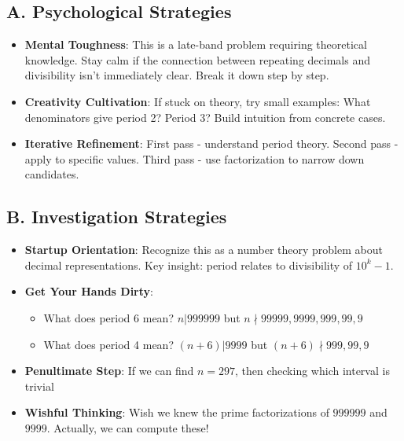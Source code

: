 \documentclass[11pt]{article}
\begin{document}
\begin{strategicbox}
\subsection*{A. Psychological Strategies}
\begin{itemize}[leftmargin=*]
    \item \textbf{Mental Toughness}: This is a late-band problem requiring theoretical knowledge. Stay calm if the connection between repeating decimals and divisibility isn't immediately clear. Break it down step by step.
    
    \item \textbf{Creativity Cultivation}: If stuck on theory, try small examples: What denominators give period 2? Period 3? Build intuition from concrete cases.
    
    \item \textbf{Iterative Refinement}: First pass - understand period theory. Second pass - apply to specific values. Third pass - use factorization to narrow down candidates.
\end{itemize}

\subsection*{B. Investigation Strategies}
\begin{itemize}[leftmargin=*]
    \item \textbf{Startup Orientation}: Recognize this as a number theory problem about decimal representations. Key insight: period relates to divisibility of $10^k - 1$.
    
    \item \textbf{Get Your Hands Dirty}: 
    \begin{itemize}
        \item What does period 6 mean? $n | 999999$ but $n \nmid 99999, 9999, 999, 99, 9$
        \item What does period 4 mean? $(n+6) | 9999$ but $(n+6) \nmid 999, 99, 9$
    \end{itemize}
    
    \item \textbf{Penultimate Step}: If we can find $n = 297$, then checking which interval is trivial
    
    \item \textbf{Wishful Thinking}: Wish we knew the prime factorizations of $999999$ and $9999$. Actually, we can compute these!
    

\end{itemize}
\end{strategicbox}
\end{document}
